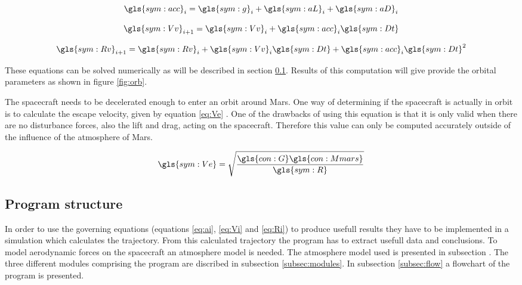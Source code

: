 \begin{equation} \label{eq:ai}
\gls{sym:acc}_i = \gls{sym:g}_i + \gls{sym:aL}_i + \gls{sym:aD}_i
\end{equation}

\begin{equation} \label{eq:Vi}
\gls{sym:Vv}_{i+1} = \gls{sym:Vv}_i + \gls{sym:acc}_i \gls{sym:Dt}
\end{equation}

\begin{equation} \label{eq:Ri}
\gls{sym:Rv}_{i+1} = \gls{sym:Rv}_i + \gls{sym:Vv}_i \gls{sym:Dt} + \gls{sym:acc}_i \gls{sym:Dt}^2
\end{equation}

These equations can be solved numerically as will be described in section \ref{sec:prog_struct}. Results of this computation will give provide the orbital parameters as shown in figure \ref{fig:orb}.

The spacecraft needs to be decelerated enough to enter an orbit around Mars. One way of determining if the spacecraft is actually in orbit is to calculate the escape velocity, given by equation \ref{eq:Ve} \cite{Wertz2011}. One of the drawbacks of using this equation is that it is only valid when there are no disturbance forces, also the lift and drag, acting on the spacecraft. Therefore this value can only be computed accurately outside of the influence of the atmosphere of Mars.

\begin{equation} \label{eq:Ve}
\gls{sym:Ve} = \sqrt{\frac{\gls{con:G}\gls{con:Mmars}}
					{\gls{sym:R}}}
\end{equation}

\subsection{Program structure}\label{sec:prog_struct}

In order to use the governing equations (equations \ref{eq:ai}, \ref{eq:Vi} and \ref{eq:Ri}) to produce usefull results they have to be implemented in a simulation which calculates the trajectory. From this calculated trajectory the program has to extract usefull data and conclusions. To model aerodynamic forces on the spacecraft an atmosphere model is needed. The atmosphere model used is presented in subsection \label{subsec:atmos}. The three different modules comprising the program are discribed in subsection \ref{subsec:modules}. In subsection \ref{subsec:flow} a flowchart of the program is presented.

